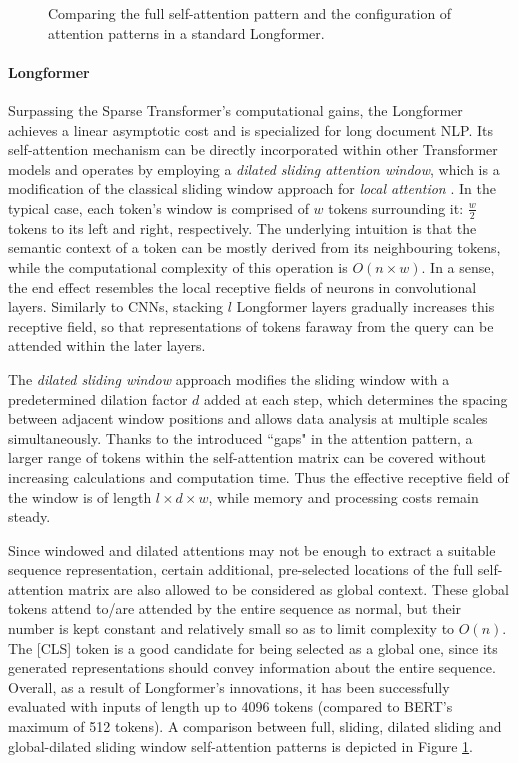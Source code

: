 \documentclass[preprint,review,10pt]{elsarticle}
\begin{document}
	\begin{figure}
		
		\centering
		\caption{Comparing the full self-attention pattern and the configuration of attention patterns in a standard Longformer.}
		\label{fig::longformer}
	\end{figure}
	
	\paragraph{Longformer} Surpassing the Sparse Transformer's computational gains, the Longformer \cite{longformer} achieves a linear asymptotic cost and is specialized for long document NLP. Its self-attention mechanism can be directly incorporated within other Transformer models and operates by employing a \textit{dilated sliding attention window}, which is a modification of the classical sliding window approach for \textit{local attention} \cite{saeed, odysseas}. In the typical case, each token's window is comprised of $w$ tokens surrounding it: $\frac{w}{2}$ tokens to its left and right, respectively. The underlying intuition is that the semantic context of a token can be mostly derived from its neighbouring tokens, while the computational complexity of this operation is $O(n \times w)$. In a sense, the end effect resembles the local receptive fields of neurons in convolutional layers. Similarly to CNNs, stacking $l$ Longformer layers gradually increases this receptive field, so that representations of tokens faraway from the query can be attended within the later layers.
	
	The \textit{dilated sliding window} approach modifies the sliding window with a predetermined dilation factor $d$ added at each step, which determines the spacing between adjacent window positions and allows data analysis at multiple scales simultaneously. Thanks to the introduced ``gaps" in the attention pattern, a larger range of tokens within the self-attention matrix can be covered without increasing calculations and computation time. Thus the effective receptive field of the window is of length $l \times d \times w$, while memory and processing costs remain steady.
	
	Since windowed and dilated attentions may not be enough to extract a suitable sequence representation, certain additional, pre-selected locations of the full self-attention matrix are also allowed to be considered as global context. These global tokens attend to/are attended by the entire sequence as normal, but their number is kept constant and relatively small so as to limit complexity to $O(n)$. The [CLS] token is a good candidate for being selected as a global one, since its generated representations should convey information about the entire sequence. Overall, as a result of Longformer's innovations, it has been successfully evaluated with inputs of length up to 4096 tokens (compared to BERT's maximum of 512 tokens). A comparison between full, sliding, dilated sliding and global-dilated sliding window self-attention patterns is depicted in Figure \ref{fig::longformer}.
	
\end{document}
